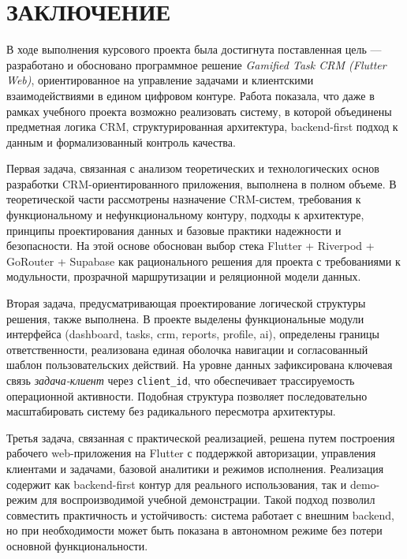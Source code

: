 \clearpage
\section*{ЗАКЛЮЧЕНИЕ}

В ходе выполнения курсового проекта была достигнута поставленная цель --- разработано и обосновано программное решение \textit{Gamified Task CRM (Flutter Web)}, ориентированное на управление задачами и клиентскими взаимодействиями в едином цифровом контуре. Работа показала, что даже в рамках учебного проекта возможно реализовать систему, в которой объединены предметная логика CRM, структурированная архитектура, backend-first подход к данным и формализованный контроль качества.

Первая задача, связанная с анализом теоретических и технологических основ разработки CRM-ориентированного приложения, выполнена в полном объеме. В теоретической части рассмотрены назначение CRM-систем, требования к функциональному и нефункциональному контуру, подходы к архитектуре, принципы проектирования данных и базовые практики надежности и безопасности. На этой основе обоснован выбор стека Flutter + Riverpod + GoRouter + Supabase как рационального решения для проекта с требованиями к модульности, прозрачной маршрутизации и реляционной модели данных.

Вторая задача, предусматривающая проектирование логической структуры решения, также выполнена. В проекте выделены функциональные модули интерфейса (dashboard, tasks, crm, reports, profile, ai), определены границы ответственности, реализована единая оболочка навигации и согласованный шаблон пользовательских действий. На уровне данных зафиксирована ключевая связь \textit{задача-клиент} через \texttt{client\_id}, что обеспечивает трассируемость операционной активности. Подобная структура позволяет последовательно масштабировать систему без радикального пересмотра архитектуры.

Третья задача, связанная с практической реализацией, решена путем построения рабочего web-приложения на Flutter с поддержкой авторизации, управления клиентами и задачами, базовой аналитики и режимов исполнения. Реализация содержит как backend-first контур для реального использования, так и demo-режим для воспроизводимой учебной демонстрации. Такой подход позволил совместить практичность и устойчивость: система работает с внешним backend, но при необходимости может быть показана в автономном режиме без потери основной функциональности.

